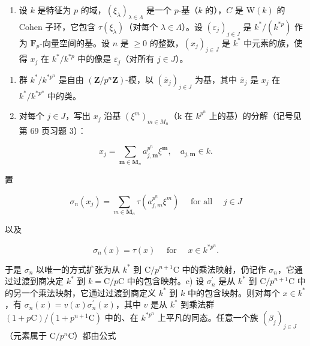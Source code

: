 \begin{enumerate}
\def\labelenumi{\arabic{enumi})}
\setcounter{enumi}{10}
\tightlist
\item
  设 \(k\) 是特征为 \(p\) 的域，\((\xi_{\lambda})_{\lambda \in \Lambda}\) 是一个 \(p\)-基（\(k\) 的），\(C\) 是 \(\mathrm{W}(k)\) 的 Cohen 子环，它包含 \(\tau(\xi_{\lambda})\)（对每个 \(\lambda \in \Lambda\)）。设 \((\varepsilon_j)_{j \in J}\) 是 \(k^*/(k^{*p})\) 作为 \(\mathbf{F}_p\)-向量空间的基。设 \(n\) 是 \(\geqslant 0\) 的整数，\((x_j)_{j \in J}\) 是 \(k^*\) 中元素的族，使得 \(x_j\) 在 \(k^*/k^{*p}\) 中的像是 \(\varepsilon_j\)（对所有 \(j \in J\)）。
\end{enumerate}

\begin{enumerate}
\def\labelenumi{\alph{enumi})}
\item
  群 \(k^{*} / k^{*p^{n}}\) 是自由 \((\mathbf{Z} / p^{n}\mathbf{Z})\)-模，以 \((\overline{x}_j)_{j\in J}\) 为基，其中 \(\overline{x}_j\) 是 \(x_j\) 在 \(k^{*} / k^{*p^{n}}\) 中的类。
\item
  对每个 \(j \in J\)，写出 \(x_{j}\) 沿基 \((\xi^{m})_{m \in M_{n}}\)（k 在 \(k^{p^{n}}\) 上的基）的分解（记号见第 69 页习题 3）：
\end{enumerate}

\[
x _ {j} = \sum_ {\boldsymbol {m} \in \mathbf {M} _ {n}} a _ {j, \boldsymbol {m}} ^ {p ^ {n}} \xi^ {\boldsymbol {m}}, \quad a _ {j, \boldsymbol {m}} \in k.
\]

置

\[
\sigma_ {n} (x _ {j}) = \sum_ {m \in \mathbf {M} _ {n}} \tau (a _ {j, m} ^ {p ^ {n}} \xi^ {m}) \quad \text { for all } \quad j \in J
\]

以及

\[
\sigma_ {n} (x) = \tau (x) \quad \text { for } \quad x \in k ^ {* p ^ {n}}.
\]

于是 \(\sigma_{n}\) 以唯一的方式扩张为从 \(k^{*}\) 到 \(\mathrm{C} / p^{n + 1}\mathrm{C}\) 中的乘法映射，仍记作 \(\sigma_{n}\)，它通过过渡到商决定 \(k^{*}\) 到 \(k = \mathrm{C} / p\mathrm{C}\) 中的包含映射。c) 设 \(\sigma_{n}^{\prime}\) 是从 \(k^{*}\) 到 \(\mathrm{C} / p^{n + 1}\mathrm{C}\) 中的另一个乘法映射，它通过过渡到商定义 \(k^{*}\) 到 \(k\) 中的包含映射。则对每个 \(x\in k^{*}\)，有 \(\sigma_{n}(x) = v(x)\sigma_{n}^{\prime}(x)\)，其中 \(v\) 是从 \(k^{*}\) 到乘法群 \((1 + p\mathrm{C}) / (1 + p^{n + 1}\mathrm{C})\) 中的、在 \(k^{*p^n}\) 上平凡的同态。任意一个族 \((\beta_j)_{j\in J}\)（元素属于 \(\mathrm{C} / p^n\mathrm{C}\)）都由公式

